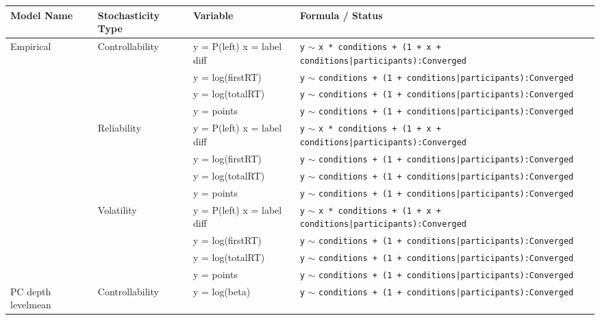 \begin{tabular}{llll}
\toprule
Model Name & Stochasticity Type & Variable & Formula / Status \\
\midrule
\multirow[t]{12}{*}{Empirical} & \multirow[t]{4}{*}{Controllability} & y = P(left) x = label diff & \texttt{y} $\sim$ \texttt{x * conditions + (1 + x + conditions|participants):Converged} \\
\cmidrule(lr){3-4}
 &  & y = log(firstRT) & \texttt{y} $\sim$ \texttt{conditions + (1 + conditions|participants):Converged} \\
\cmidrule(lr){3-4}
 &  & y = log(totalRT) & \texttt{y} $\sim$ \texttt{conditions + (1 + conditions|participants):Converged} \\
\cmidrule(lr){3-4}
 &  & y = points & \texttt{y} $\sim$ \texttt{conditions + (1 + conditions|participants):Converged} \\
\cmidrule(lr){2-4} \cmidrule(lr){3-4}
 & \multirow[t]{4}{*}{Reliability} & y = P(left) x = label diff & \texttt{y} $\sim$ \texttt{x * conditions + (1 + x + conditions|participants):Converged} \\
\cmidrule(lr){3-4}
 &  & y = log(firstRT) & \texttt{y} $\sim$ \texttt{conditions + (1 + conditions|participants):Converged} \\
\cmidrule(lr){3-4}
 &  & y = log(totalRT) & \texttt{y} $\sim$ \texttt{conditions + (1 + conditions|participants):Converged} \\
\cmidrule(lr){3-4}
 &  & y = points & \texttt{y} $\sim$ \texttt{conditions + (1 + conditions|participants):Converged} \\
\cmidrule(lr){2-4} \cmidrule(lr){3-4}
 & \multirow[t]{4}{*}{Volatility} & y = P(left) x = label diff & \texttt{y} $\sim$ \texttt{x * conditions + (1 + x + conditions|participants):Converged} \\
\cmidrule(lr){3-4}
 &  & y = log(firstRT) & \texttt{y} $\sim$ \texttt{conditions + (1 + conditions|participants):Converged} \\
\cmidrule(lr){3-4}
 &  & y = log(totalRT) & \texttt{y} $\sim$ \texttt{conditions + (1 + conditions|participants):Converged} \\
\cmidrule(lr){3-4}
 &  & y = points & \texttt{y} $\sim$ \texttt{conditions + (1 + conditions|participants):Converged} \\
\cmidrule(lr){1-4} \cmidrule(lr){2-4} \cmidrule(lr){3-4}
\multirow[t]{3}{*}{PC depth levelmean} & Controllability & y = log(beta) & \texttt{y} $\sim$ \texttt{conditions + (1 + conditions|participants):Converged} \\

\end{tabular}
